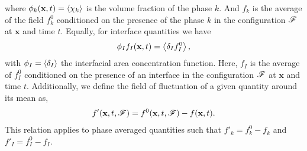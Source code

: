 where $\phi_k(\textbf{x},t) = \left<\chi_k\right>$ is the volume fraction of the phase $k$.
And $f_k$ is the average of the field $f_k^0$ conditioned on the presence of the phase $k$ in the configuration $\mathscr{F}$ at $\textbf{x}$ and time $t$.
Equally, for interface quantities we have 
\begin{equation}
    \phi_I f_I (\textbf{x},t) = \left<\delta_I f_I^0\right>,
\end{equation}
with $\phi_I = \left<\delta_I\right>$ the interfacial area concentration function. 
Here, $f_I$ is the average of $f^0_I$ conditioned on the presence of an interface in the configuration $\mathscr{F}$ at $\textbf{x}$ and time $t$. 
Additionally, we define the field of fluctuation of a given quantity around its mean as,
\begin{align}
    f'(\textbf{x},t,\mathscr{F}) = f^0(\textbf{x},t,\mathscr{F}) - f(\textbf{x},t).
    \label{eq:def_fluctu}
\end{align}
This relation applies to phase averaged quantities such that $f'_k = f^0_k - f_k$ and $f'_I = f^0_I - f_I$. 



